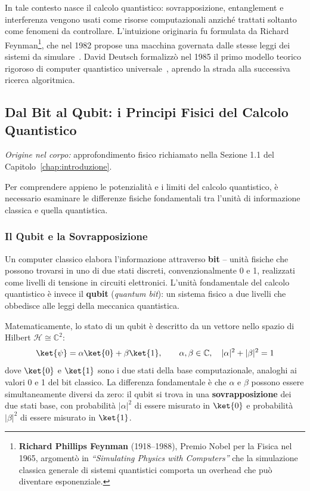 \begin{onehalfspace}
In tale contesto nasce il calcolo quantistico: sovrapposizione, entanglement e interferenza vengono usati come risorse computazionali anziché trattati soltanto come fenomeni da controllare. L'intuizione originaria fu formulata da Richard Feynman\footnote{\textbf{Richard Phillips Feynman} (1918--1988), Premio Nobel per la Fisica nel 1965, argomentò in \textit{``Simulating Physics with Computers''} che la simulazione classica generale di sistemi quantistici comporta un overhead che può diventare esponenziale.}, che nel 1982 propose una macchina governata dalle stesse leggi dei sistemi da simulare~\cite{feynman1982}. David Deutsch formalizzò nel 1985 il primo modello teorico rigoroso di computer quantistico universale~\cite{deutsch1985}, aprendo la strada alla successiva ricerca algoritmica.

\subsection{Dal Bit al Qubit: i Principi Fisici del Calcolo Quantistico}
\label{app:intro:qubit}

\noindent\textit{Origine nel corpo:} approfondimento fisico richiamato nella Sezione 1.1 del Capitolo~\ref{chap:introduzione}.

Per comprendere appieno le potenzialità e i limiti del calcolo quantistico, è necessario esaminare le differenze fisiche fondamentali tra l'unità di informazione classica e quella quantistica.

\subsubsection{Il Qubit e la Sovrapposizione}

Un computer classico elabora l'informazione attraverso \textbf{bit} -- unità fisiche che possono trovarsi in uno di due stati discreti, convenzionalmente 0 e 1, realizzati come livelli di tensione in circuiti elettronici. L'unità fondamentale del calcolo quantistico è invece il \textbf{qubit} (\textit{quantum bit}): un sistema fisico a due livelli che obbedisce alle leggi della meccanica quantistica.

Matematicamente, lo stato di un qubit è descritto da un vettore nello spazio di Hilbert $\mathcal{H} \cong \mathbb{C}^2$:
\begin{equation}
    \ket{\psi} = \alpha\ket{0} + \beta\ket{1}, \qquad \alpha,\beta \in \mathbb{C}, \quad |\alpha|^2 + |\beta|^2 = 1
    \label{eq:qubit_state}
\end{equation}
dove $\ket{0}$ e $\ket{1}$ sono i due stati della base computazionale, analoghi ai valori 0 e 1 del bit classico. La differenza fondamentale è che $\alpha$ e $\beta$ possono essere simultaneamente diversi da zero: il qubit si trova in una \textbf{sovrapposizione} dei due stati base, con probabilità $|\alpha|^2$ di essere misurato in $\ket{0}$ e probabilità $|\beta|^2$ di essere misurato in $\ket{1}$.


\end{onehalfspace}
